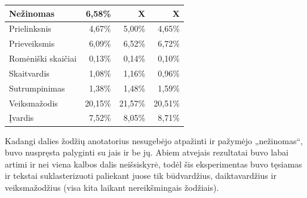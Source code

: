 \documentclass{VUMIFInfBakalaurinis}
\begin{document}
\begin{table}[H]
\begin{tabular}{|l|r|r|r|}
Nežinomas                 & 6,58\%                          & X                                                                                              & X                                                                                           \\ \hline
Prielinksnis              & 4,67\%                          & 5,00\%                                                                                         & 4,65\%                                                                                     \\ \hline
Prieveiksmis              & 6,09\%                          & 6,52\%                                                                                         & 6,72\%                                                                                     \\ \hline
Romėniški skaičiai        & 0,13\%                          & 0,14\%                                                                                         & 0,10\%                                                                                     \\ \hline
Skaitvardis               & 1,08\%                          & 1,16\%                                                                                         & 0,96\%                                                                                     \\ \hline
Sutrumpinimas             & 1,38\%                          & 1,48\%                                                                                         & 1,59\%                                                                                     \\ \hline
Veiksmažodis              & 20,15\%                         & 21,57\%                                                                                        & 20,51\%                                                                                    \\ \hline
Įvardis                   & 7,52\%                          & 8,05\%                                                                                         & 8,71\%                                                                                     \\ \hline
\end{tabular}
\end{table}

Kadangi dalies žodžių anotatorius nesugebėjo atpažinti ir pažymėjo
„nežinomas“, buvo nuspręsta palyginti su jais ir be jų. Abiem atvejais
rezultatai buvo labai artimi ir nei viena kalbos dalis neišsiskyrė,
todėl šis eksperimentas buvo tęsiamas ir tekstai suklasterizuoti
paliekant juose tik būdvardžius, daiktavardžius ir veiksmažodžius (visa
kita laikant nereikšmingais žodžiais).
\end{document}

